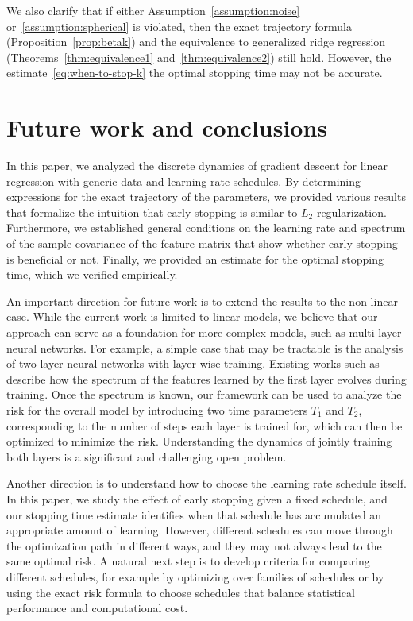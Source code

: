 \documentclass[11pt]{article}
\begin{document}
We also clarify that if either Assumption~\ref{assumption:noise} or~\ref{assumption:spherical} is violated, then the exact trajectory formula (Proposition~\ref{prop:betak}) and the equivalence to generalized ridge regression (Theorems~\ref{thm:equivalence1} and~\ref{thm:equivalence2}) still hold. However, the estimate~\eqref{eq:when-to-stop-k} the optimal stopping time may not be accurate.

\nocite{pytorch2019}

\clearpage

\section{Future work and conclusions}

In this paper, we analyzed the discrete dynamics of gradient descent for linear regression with generic data and learning rate schedules. By determining expressions for the exact trajectory of the parameters, we provided various results that formalize the intuition that early stopping is similar to $L_2$ regularization. Furthermore, we established general conditions on the learning rate and spectrum of the sample covariance of the feature matrix that show whether early stopping is beneficial or not. Finally, we provided an estimate for the optimal stopping time, which we verified empirically.

An important direction for future work is to extend the results to the non-linear case. While the current work is limited to linear models, we believe that our approach can serve as a foundation for more complex models, such as multi-layer neural networks.
For example, a simple case that may be tractable is the analysis of two-layer neural networks with layer-wise training. Existing works such as~\cite{moniri2024theory, wang2024nonlinear} describe how the spectrum of the features learned by the first layer evolves during training. Once the spectrum is known, our framework can be used to analyze the risk for the overall model by introducing two time parameters $T_1$ and $T_2$, corresponding to the number of steps each layer is trained for, which can then be optimized to minimize the risk. Understanding the dynamics of jointly training both layers is a significant and challenging open problem.

Another direction is to understand how to choose the learning rate schedule itself. In this paper, we study the effect of early stopping given  a fixed schedule, and our stopping time estimate identifies when that schedule has accumulated an appropriate amount of learning. However, different schedules can move through the optimization path in different ways, and they may not always lead to the same optimal risk. A natural next step is to develop criteria for comparing different schedules, for example by optimizing over families of schedules or by using the exact risk formula to choose schedules that balance statistical performance and computational cost.
\end{document}
